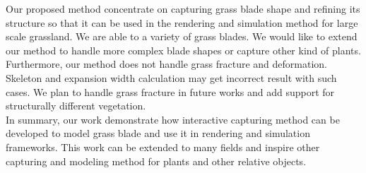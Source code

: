 \documentclass[10pt,journal,compsoc]{IEEEtran}
\begin{document}
Our proposed method concentrate on capturing grass blade shape and refining its structure so that it can be used in the rendering and simulation method for large scale grassland. We are able to a variety of grass blades. We would like to extend our method to handle more complex blade shapes or capture other kind of plants. Furthermore, our method does not handle grass fracture and deformation. Skeleton and expansion width calculation may get incorrect result with such cases. We plan to handle grass fracture in future works and add support for structurally different vegetation.\\

In summary, our work demonstrate how interactive capturing method can be developed to model grass blade and use it in rendering and simulation frameworks. This work can be extended to many fields and inspire other capturing and modeling method for plants and other relative objects.




%


%
\end{document}
